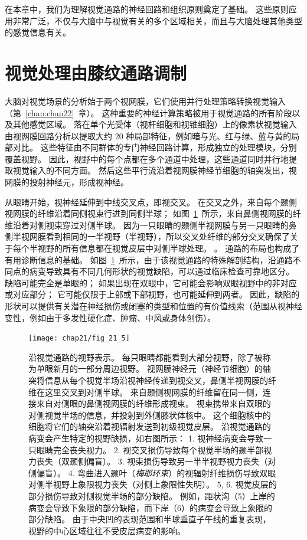 在本章中，我们为理解视觉通路的神经回路和组织原则奠定了基础。
这些原则应用非常广泛，不仅与大脑中与视觉有关的多个区域相关，而且与大脑处理其他类型的感觉信息有关。



\section{视觉处理由膝纹通路调制}

大脑对视觉场景的分析始于两个视网膜，它们使用并行处理策略转换视觉输入（第~\ref{chap:chap22}~章）。
这种重要的神经计算策略被用于视觉通路的所有阶段以及其他感觉区域。
落在单个光受体（视杆细胞和视锥细胞）上的像素状视觉输入由视网膜回路分析以提取大约 20 种局部特征，例如暗与光、红与绿、蓝与黄的局部对比。
这些特征由不同群体的专门神经回路计算，形成独立的处理模块，分别覆盖视野。
因此，视野中的每个点都在多个通道中处理，这些通道同时并行地提取视觉输入的不同方面。
然后这些平行流沿着视网膜神经节细胞的轴突发出，视网膜的投射神经元，形成视神经。


从眼睛开始，视神经延伸到中线交叉点，即视交叉。
在交叉之外，来自每个颞侧视网膜的纤维沿着同侧视束行进到同侧半球；
如图~\ref{fig:21_5}~所示，来自鼻侧视网膜的纤维沿着对侧视束穿过对侧半球。
因为一只眼睛的颞侧半视网膜与另一只眼睛的鼻侧半视网膜看到相同的一半视野（半视野），所以交叉处纤维的部分交叉确保了关于每个半视野的所有信息都在视觉皮层中对侧半球处理。 。
通路的布局也构成了有用诊断信息的基础。
如图~\ref{fig:21_5}~所示，由于该视觉通路的特殊解剖结构，沿通路不同点的病变导致具有不同几何形状的视觉缺陷，可以通过临床检查可靠地区分。
缺陷可能完全是单眼的；
如果出现在双眼中，它可能会影响双眼视野中的非对应或对应部分；
它可能仅限于上部或下部视野，也可能延伸到两者。
因此，缺陷的形状可以提供有关潜在神经损伤或闭塞的类型和位置的有价值线索（范围从视神经变性，例如由于多发性硬化症、肿瘤、中风或身体创伤）。


\begin{figure}[htbp]
	\centering
	\texttt{[image: chap21/fig\_21\_5]}
	\caption{沿视觉通路的视野表示。
		每只眼睛都能看到大部分视野，除了被称为单眼新月的一部分周边视野。
		视网膜神经元（神经节细胞）的轴突将信息从每个视觉半场沿视神经传递到视交叉，鼻侧半视网膜的纤维在这里交叉到对侧半球。
		来自颞侧视网膜的纤维留在同一侧，连接来自对侧眼的鼻侧视网膜的纤维形成视束。
		视束携带来自双眼的对侧视觉半场的信息，并投射到外侧膝状体核中。
		这个细胞核中的细胞将它们的轴突沿着视辐射发送到初级视觉皮层。
		沿视觉通路的病变会产生特定的视野缺损，如右图所示：
		1. 视神经病变会导致一只眼睛完全丧失视力。
		2. 视交叉损伤导致每个视觉半场的颞半部视力丧失（双颞侧偏盲）。
		3. 视束损伤导致另一半半视野视力丧失（对侧偏盲）。
		4. 弯曲进入颞叶（\textit{梅耶环束}）的视辐射纤维损伤导致双眼对侧半视野上象限视力丧失（对侧上象限性失明）。
		5, 6. 视觉皮层的部分损伤导致对侧视觉半场的部分缺陷。
		例如，距状沟（5）上岸的病变会导致下象限的部分缺陷，而下岸（6）的病变会导致上象限的部分缺陷。 由于中央凹的表现范围和半球垂直子午线的重复表现，视野的中心区域往往不受皮层病变的影响。}
	\label{fig:21_5}
\end{figure}


